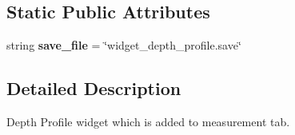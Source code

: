 \subsection*{Static Public Attributes}
\begin{DoxyCompactItemize}
\item 
\hypertarget{classDialogs_1_1DepthProfileDialog_1_1DepthProfileWidget_ac519dfb8a1a94fc5444da09d10cad600}{string {\bfseries save\-\_\-file} = \char`\"{}widget\-\_\-depth\-\_\-profile.\-save\char`\"{}}\label{classDialogs_1_1DepthProfileDialog_1_1DepthProfileWidget_ac519dfb8a1a94fc5444da09d10cad600}

\end{DoxyCompactItemize}


\subsection{Detailed Description}
\begin{DoxyVerb}Depth Profile widget which is added to measurement tab.
\end{DoxyVerb}
 


